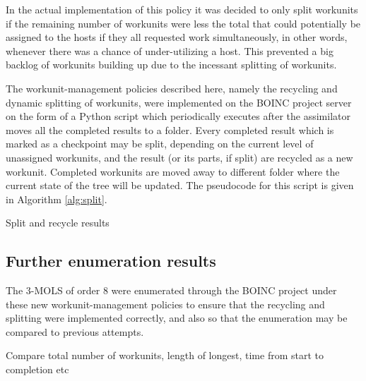 In the actual implementation of this policy it was decided to only split workunits if the remaining number of workunits were less the total that could potentially be assigned to the hosts if they all requested work simultaneously, in other words, whenever there was a chance of under-utilizing a host. This prevented a big backlog of workunits building up due to the incessant splitting of workunits. 
 

The workunit-management policies described here, namely the recycling and dynamic splitting of workunits, were implemented on the BOINC project server on the form of a Python \cite{} script which periodically executes after the assimilator moves all the completed results to a folder. Every completed result which is marked as a checkpoint may be split, depending on the current level of unassigned workunits, and the result (or its parts, if split) are recycled as a new workunit. Completed workunits  are moved away to different folder where the current state of the tree will be updated. The pseudocode for this script is given in Algorithm \ref{alg:split}.
 \begin{algorithm}[htb]
 \BlankLine
{}	
\caption{Split and recycle results} \label{alg:split}%

\end{algorithm}


\subsection{Further enumeration results}
The 3-MOLS of order 8 were enumerated through the BOINC project under these new workunit-management policies to ensure that the recycling and splitting were implemented correctly, and also so that the enumeration may be compared to previous attempts.


Compare total number of workunits, length of longest, time from start to completion etc

